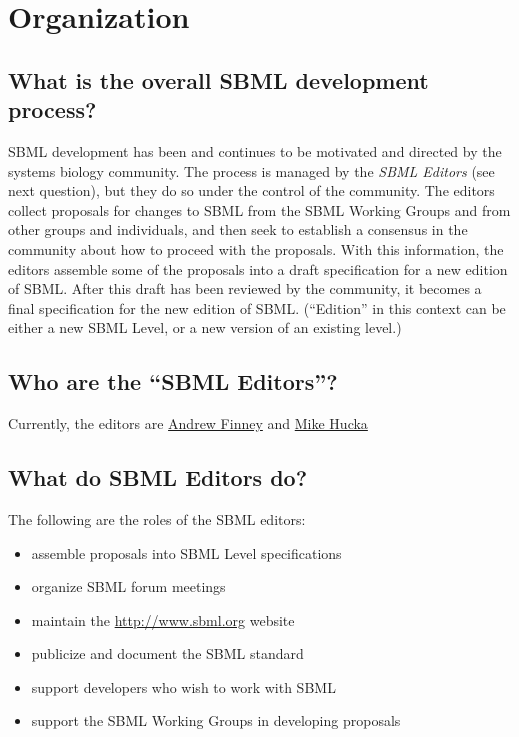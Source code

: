 \documentclass{sbmlfaq}
\begin{document}
\section{Organization}
\label{sec:organization}

\subsection{What is the overall SBML development process?}

SBML development has been and continues to be motivated and directed by the
systems biology community.  The process is managed by the \emph{SBML
  Editors} (see next question), but they do so under the control of the
community.  The editors collect proposals for changes to SBML from the SBML
Working Groups and from other groups and individuals, and then seek to
establish a consensus in the community about how to proceed with the
proposals.  With this information, the editors assemble some of the
proposals into a draft specification for a new edition of SBML.  After this
draft has been reviewed by the community, it becomes a final specification
for the new edition of SBML.  (``Edition'' in this context can be either a
new SBML Level, or a new version of an existing level.)


\subsection{Who are the ``SBML Editors''?}

Currently, the editors are \href{mailto:afinney@cds.caltech.edu}{Andrew
  Finney} and \href{mailto:mhucka@caltech.edu}{Mike Hucka}


\subsection{What do SBML Editors do?}

The following are the roles of the SBML editors:

\begin{itemize}\setlength{\parskip}{0ex}

\item assemble proposals into SBML Level specifications
\item organize SBML forum meetings
\item maintain the \url{http://www.sbml.org} website
\item publicize and document the SBML standard
\item support developers who wish to work with SBML
\item support the SBML Working Groups in developing proposals

\end{itemize}
\end{document}
